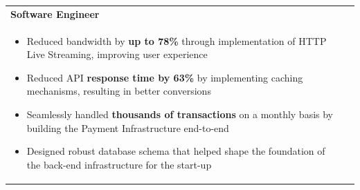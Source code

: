 \documentclass[a4paper,8pt]{article}
\begin{document}
\begin{tabularx}{\linewidth}{ @{}l r@{} }
\large\textbf{Software Engineer} \hfill \\[4pt]
\begin{minipage}[t]{\linewidth}
    \begin{itemize}[nosep,after=\strut, leftmargin=2em, itemsep=2pt]
        \item Reduced  bandwidth by \textbf{up to 78\%} through implementation of HTTP Live Streaming, improving user experience
        \item Reduced API \textbf{response time by 63\%} by implementing caching mechanisms, resulting in better conversions
        \item Seamlessly handled \textbf{thousands of transactions} on a monthly basis by building the Payment Infrastructure end-to-end
        \item Designed robust database schema that helped shape the foundation of the back-end infrastructure for the start-up    \end{itemize}
\end{minipage}
\end{tabularx}

\end{document}
